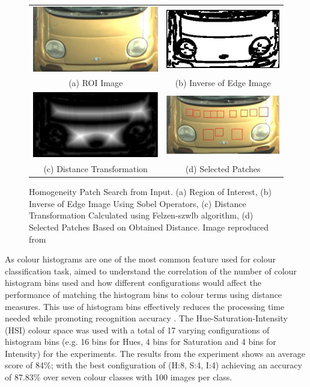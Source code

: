 \begin{figure}[!htb]
 \centering
 \begin{tabular}{cc}
  \includegraphics[width=0.3\linewidth]{image/lit/homo1.png}
 & \includegraphics[width=0.3\linewidth]{image/lit/homo3.png} \\
  (a) ROI Image
 & (b) Inverse of Edge Image \\
  \includegraphics[width=0.3\linewidth]{image/lit/homo2.png} &
  \includegraphics[width=0.3\linewidth]{image/lit/homo4.png} \\
  (c) Distance Transformation &
  (d) Selected Patches\\
 \end{tabular}
 \caption[Homogeneity Patch Search from Input. (a) Region of Interest, (b)
Inverse of Edge Image Using Sobel Operators, (c) Distance Transformation
Calculated using Felzen-szwlb algorithm, (d) Selected Patches Based on Obtained
Distance.]{Homogeneity Patch Search from Input. (a) Region of Interest, (b)
Inverse of Edge Image Using Sobel Operators, (c) Distance Transformation
Calculated using Felzen-szwlb algorithm, (d) Selected Patches Based on Obtained
Distance. Image reproduced from 
 \label{fig:colorpatches}}
\end{figure}

As colour histograms are one of the most common feature used for colour
classification task,  aimed to understand the correlation
of the number of colour histogram bins used and how different configurations
would affect the performance of matching the histogram bins to colour terms
using distance measures. This use of histogram bins effectively reduces the
processing time needed while promoting recognition accuracy
\cite{zhang2017vehicle}. The Hue-Saturation-Intensity (HSI) colour space was
used with a total of 17 varying configurations of histogram bins (e.g. 16 bins
for Hues, 4 bins for Saturation and 4 bins for Intensity) for the experiments.
The results from the experiment shows an average score of 84\%; with the best
configuration of (H:8, S:4, I:4) achieving an accuracy of 87.83\% over seven
colour classes with 100 images per class.

